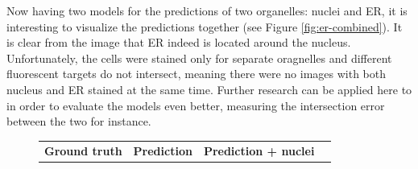 Now having two models for the predictions of two organelles: nuclei and ER, it is interesting to visualize the predictions together (see Figure \ref{fig:er-combined}). It is clear from the image that ER indeed is located around the nucleus. Unfortunately, the cells were stained only for separate oragnelles and different fluorescent targets do not intersect, meaning there were no images with both nucleus and ER stained at the same time. Further research can be applied here to in order to evaluate the models even better, measuring the intersection error between the two for instance.
\begin{figure}[htb]
    \centering
    \centering
        \begin{tabularx}{\textwidth}{YYYY}
            \textbf{Ground truth} &
            \textbf{Prediction} &
            \textbf{Prediction + nuclei} \\

\end{tabularx}
\end{figure}
